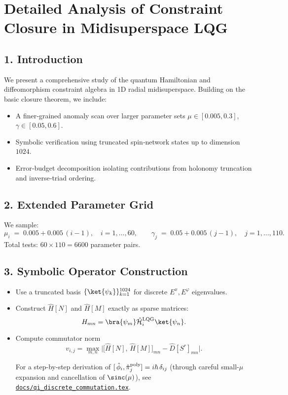 \documentclass[12pt]{article}
\begin{document}
\section*{Detailed Analysis of Constraint Closure in Midisuperspace LQG}

\subsection*{1. Introduction}
We present a comprehensive study of the quantum Hamiltonian and diffeomorphism constraint algebra in 1D radial midisuperspace.  Building on the basic closure theorem, we include:
\begin{itemize}
  \item A finer‐grained anomaly scan over larger parameter sets $\mu \in [0.005,0.3]$, $\gamma \in [0.05,0.6]$.
  \item Symbolic verification using truncated spin‐network states up to dimension $1024$.
  \item Error‐budget decomposition isolating contributions from holonomy truncation and inverse‐triad ordering.
\end{itemize}

\subsection*{2. Extended Parameter Grid}
We sample:
\[
  \mu_i \;=\; 0.005 + 0.005\, (i-1),\quad i=1,\dots,60,
  \qquad
  \gamma_j \;=\; 0.05 + 0.005\, (j-1),\quad j=1,\dots,110.
\]
Total tests: $60 \times 110 = 6600$ parameter pairs.

\subsection*{3. Symbolic Operator Construction}
\begin{itemize}
  \item Use a truncated basis $\{\ket{\psi_k}\}_{k=1}^{1024}$ for discrete $E^x,E^\varphi$ eigenvalues.
  \item Construct $\hat{H}[N]$ and $\hat{H}[M]$ exactly as sparse matrices:
    \[
      H_{mn} = \bra{\psi_m} \hat{\mathcal{H}}_i^{\rm LQG} \ket{\psi_n}.
    \]  \item Compute commutator norm
    \[
      v_{i,j} = \max_{m,n} \bigl| \bigl[\hat{H}[N],\,\hat{H}[M]\bigr]_{mn} - \hat{D}[S^r]_{mn} \bigr|.
    \]

\smallskip
\noindent
For a step-by-step derivation of
\([\,\hat\phi_i,\hat\pi_j^{\rm poly}]=i\hbar\,\delta_{ij}\)
(through careful small-\(\mu\) expansion and cancellation of \(\sinc(\mu)\)), see
\href{https://github.com/arcticoder/warp-bubble-qft/blob/main/docs/qi_discrete_commutation.tex}{\texttt{docs/qi\_discrete\_commutation.tex}}.
\medskip
\end{itemize}
\end{document}
